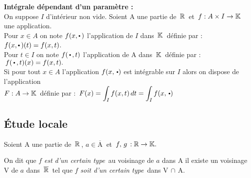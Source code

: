 \textbf{Intégrale dépendant d'un paramètre :}\vspace{0.2cm}\\
On suppose $I$ d'intérieur non vide. Soient A une partie de $\,\mathbb{R}\,$ et \(\,f:A\times I\to \mathbb{K}\,\) une application.\vspace{0.1cm}\\
Pour \(x\in A\) on note \(f(x,\sbullet[0.6]\, )\) l'application de $I$ dans $\,\mathbb{K}\,$ définie par : \(f(x,\sbullet[0.6]\,)(t)=f(x,t)\).\vspace{0.1cm} \\
Pour \(t\in I\) on note \(f(\,\sbullet[0.6]\,,t)\) l'application de A dans \(\,\mathbb{K}\,\) définie par : \(\,f(\,\sbullet[0.6]\,,t)(x)=f(x,t).\)\vspace{0.3cm}\\
Si pour tout \(x\in A\) l'application \(f(x,\,\sbullet[0.6])\) est intégrable sur $I$ alors on dispose de l'application\vspace{0.1cm}\\
\(F:A\to \mathbb{K}\,\) définie par : \(\,\displaystyle F(x)=\int_I f(x,t)\,dt=\int_If(x,\,\sbullet[0.6])\)

\vspace{1.5cm}

\subsection{Étude locale}

\vspace{0.5cm}

\begin{center}
    Soient A une partie de \(\,\mathbb{R}\,\), \(a\in \overline{\text{A}}\:\) et \(\,f,\,g\,:\mathbb{R}\to \mathbb{K}.\)
\end{center}

\vspace{1cm}

On dit que $f$ \guillemetleft \emph{est d'un certain type}\guillemetright\, au voisinage de $a$ dans A \ssi il existe un voisinage V de $a$ dans \(\,\overline{\mathbb{R}}\,\) tel que $f$ \guillemetleft \emph{soit d'un certain type}\guillemetright\, dans V\(\,\cap\,\)A.

\vspace{1.3cm}

